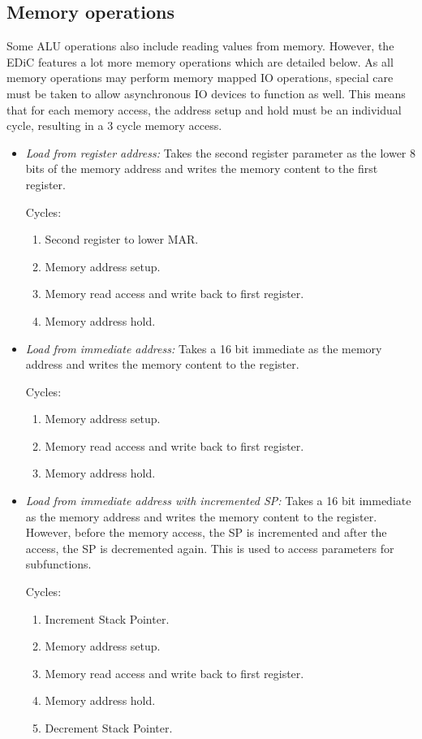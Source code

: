 \subsection{Memory operations} Some \gls{ALU} operations also include reading values from memory.
However, the \gls{EDiC} features a lot more memory operations which are detailed below.
As all memory operations may perform memory mapped \gls{IO} operations, special care must be taken to allow asynchronous \gls{IO} devices to function as well.
This means that for each memory access, the address setup and hold must be an individual cycle, resulting in a 3 cycle memory access.
\begin{itemize}
  \item \emph{Load from register address:} Takes the second register parameter as the lower 8 bits of the memory address and writes the memory content to the first register.

  Cycles:
  \begin{enumerate}
    \item Second register to lower \gls{MAR}.
    \item Memory address setup.
    \item Memory read access and write back to first register.
    \item Memory address hold.
  \end{enumerate}

  \item \emph{Load from immediate address:} Takes a 16 bit immediate as the memory address and writes the memory content to the register.

  Cycles:
  \begin{enumerate}
    \item Memory address setup.
    \item Memory read access and write back to first register.
    \item Memory address hold.
  \end{enumerate}

  \item \emph{Load from immediate address with incremented \gls{SP}:} Takes a 16 bit immediate as the memory address and writes the memory content to the register.
  However, before the memory access, the \gls{SP} is incremented and after the access, the \gls{SP} is decremented again.
  This is used to access parameters for subfunctions.

  Cycles:
  \begin{enumerate}
    \item Increment Stack Pointer.
    \item Memory address setup.
    \item Memory read access and write back to first register.
    \item Memory address hold.
    \item Decrement Stack Pointer.
  \end{enumerate}


\end{itemize}

